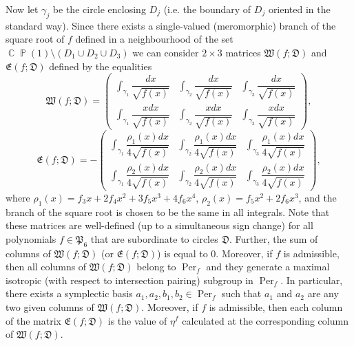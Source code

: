 \documentclass{amsart}
\numberwithin{equation}{section}
\theoremstyle{definition}
\theoremstyle{remark}
\DeclareMathOperator{\CC}{\mathbb C}
\DeclareMathOperator{\PP}{\mathbb P}
\DeclareMathOperator{\Per}{Per}
\begin{document}
	Now let $\gamma_j$ be the circle enclosing $D_j$ (i.e. the boundary of $D_j$ oriented in the standard way). Since there exists a single-valued (meromorphic) branch of the square root of $f$ defined in a neighbourhood of the set $\CC\PP(1) \setminus (D_1 \cup D_2 \cup D_3)$ we can consider $2 \times 3$ matrices $\mathfrak W(f;\mathfrak D)$ and $\mathfrak E(f;\mathfrak D)$ defined by the equalities
	\begin{equation}\label{eqWMatrix}
		\mathfrak W(f;\mathfrak D) = \begin{pmatrix}
			\displaystyle\int_{\gamma_1} \dfrac{dx}{\sqrt{f(x)}} & \displaystyle\int_{\gamma_2} \dfrac{dx}{\sqrt{f(x)}}  & \displaystyle\int_{\gamma_3} \dfrac{dx}{\sqrt{f(x)}} \\
			\displaystyle\int_{\gamma_1} \dfrac{xdx}{\sqrt{f(x)}} & \displaystyle\int_{\gamma_2} \dfrac{xdx}{\sqrt{f(x)}} &\displaystyle\int_{\gamma_3} \dfrac{xdx}{\sqrt{f(x)}}
		\end{pmatrix},
	\end{equation}
	\begin{equation}\label{eqEMatrix}
		\mathfrak E(f;\mathfrak D) = -
		\begin{pmatrix}
			\displaystyle\int_{\gamma_1} \dfrac{\rho_1(x)dx}{4\sqrt{f(x)}} & \displaystyle\int_{\gamma_2} \dfrac{\rho_1(x)dx}{4\sqrt{f(x)}}  & \displaystyle\int_{\gamma_3} \dfrac{\rho_1(x)dx}{4\sqrt{f(x)}} \\
			\displaystyle\int_{\gamma_1} \dfrac{\rho_2(x)dx}{4\sqrt{f(x)}} & \displaystyle\int_{\gamma_2} \dfrac{\rho_2(x)dx}{4\sqrt{f(x)}}  & \displaystyle\int_{\gamma_3} \dfrac{\rho_2(x)dx}{4\sqrt{f(x)}}
		\end{pmatrix},
	\end{equation}
	where $\rho_1(x) = f_3x + 2f_4 x^2 + 3f_5 x^3 + 4f_6x^4$, $\rho_2(x) = f_5x^2 + 2f_6x^3$, and the branch of the square root is chosen to be the same in all integrals. Note that these matrices are well-defined (up to a simultaneous sign change) for all polynomials $f \in \mathfrak P_6$ that are subordinate to circles $\mathfrak D$. Further, the sum of columns of $\mathfrak W(f;\mathfrak D)$ (or $\mathfrak E(f;\mathfrak D)$) is equal to $0$. Moreover, if $f$ is admissible, then all columns of $\mathfrak W(f;\mathfrak D)$ belong to $\Per_f$ and they generate a maximal isotropic (with respect to intersection pairing) subgroup in $\Per_f$. In particular, there exists a symplectic basis $a_1,a_2,b_1,b_2 \in \Per_f$ such that $a_1$ and $a_2$ are any two given columns of $\mathfrak W(f;\mathfrak D)$. Moreover, if $f$ is admissible, then each column of the matrix $\mathfrak E(f;\mathfrak D)$ is the value of $\eta^f$ calculated at the corresponding column of $\mathfrak W(f;\mathfrak D)$.
	
\end{document}
